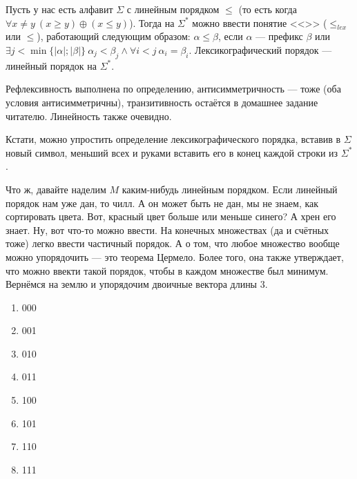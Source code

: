 \documentclass{article}
\begin{document}
\begin{itemize}
\begin{Comment}
        \end{Comment}
        \dfn Пусть у нас есть алфавит $\Sigma$ с линейным порядком $\leqslant$ (то есть когда $\forall x\neq y~(x\geqslant y)\oplus(x\leqslant y)$). Тогда на $\Sigma^*$ можно ввести понятие <<>> ($\leqslant_{lex}$ или $\leqslant$), работающий следующим образом: $\alpha\leqslant\beta$, если $\alpha$ --- префикс $\beta$ или $\exists j<\min\{|\alpha|;|\beta|\}~\alpha_j<\beta_j\land\forall i<j~\alpha_i=\beta_i$.
        \thm Лексикографический порядок --- линейный порядок на $\Sigma^*$.
        \begin{Proof}
            Рефлексивность выполнена по определению, антисимметричность --- тоже (оба условия антисимметричны), транзитивность остаётся в домашнее задание читателю. Линейность также очевидно.
        \end{Proof}
        \begin{Comment}
            Кстати, можно упростить определение лексикографического порядка, вставив в $\Sigma$ новый символ, меньший всех и руками вставить его в конец каждой строки из $\Sigma^*$.
        \end{Comment}
        \begin{Comment}
            Что ж, давайте наделим $M$ каким-нибудь линейным порядком. Если линейный порядок нам уже дан, то чилл. А он может быть не дан, мы не знаем, как сортировать цвета. Вот, красный цвет больше или меньше синего? А хрен его знает. Ну, вот что-то можно ввести. На конечных множествах (да и счётных тоже) легко ввести частичный порядок. А о том, что любое множество вообще можно упорядочить --- это теорема Цермело. Более того, она также утверждает, что можно ввекти такой порядок, чтобы в каждом множестве был минимум.\\
            Вернёмся на землю и упорядочим двоичные вектора длины 3.
            \begin{enumerate}
                \addtocounter{enumi}{-1}
                \item 000
                \item 001
                \item 010
                \item 011
                \item 100
                \item 101
                \item 110
                \item 111
            \end{enumerate}

\end{Comment}
\end{itemize}
\end{document}
